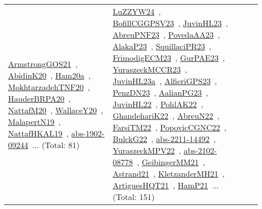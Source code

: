 {\begin{longtable}{lp{3cm}>{\raggedright\arraybackslash}p{6cm}>{\raggedright\arraybackslash}p{6cm}>{\raggedright\arraybackslash}p{8cm}}
\href{../works/ArmstrongGOS21.pdf}{ArmstrongGOS21}~\cite{ArmstrongGOS21}, \href{../works/AbidinK20.pdf}{AbidinK20}~\cite{AbidinK20}, \href{../works/Ham20a.pdf}{Ham20a}~\cite{Ham20a}, \href{../works/MokhtarzadehTNF20.pdf}{MokhtarzadehTNF20}~\cite{MokhtarzadehTNF20}, \href{../works/HauderBRPA20.pdf}{HauderBRPA20}~\cite{HauderBRPA20}, \href{../works/NattafM20.pdf}{NattafM20}~\cite{NattafM20}, \href{../works/WallaceY20.pdf}{WallaceY20}~\cite{WallaceY20}, \href{../works/MalapertN19.pdf}{MalapertN19}~\cite{MalapertN19}, \href{../works/NattafHKAL19.pdf}{NattafHKAL19}~\cite{NattafHKAL19}, \href{../works/abs-1902-09244.pdf}{abs-1902-09244}~\cite{abs-1902-09244}... (Total: 81) & \href{../works/LuZZYW24.pdf}{LuZZYW24}~\cite{LuZZYW24}, \href{../works/BofillCGGPSV23.pdf}{BofillCGGPSV23}~\cite{BofillCGGPSV23}, \href{../works/JuvinHL23.pdf}{JuvinHL23}~\cite{JuvinHL23}, \href{../works/AbreuPNF23.pdf}{AbreuPNF23}~\cite{AbreuPNF23}, \href{../works/PovedaAA23.pdf}{PovedaAA23}~\cite{PovedaAA23}, \href{../works/AlakaP23.pdf}{AlakaP23}~\cite{AlakaP23}, \href{../works/SquillaciPR23.pdf}{SquillaciPR23}~\cite{SquillaciPR23}, \href{../works/FrimodigECM23.pdf}{FrimodigECM23}~\cite{FrimodigECM23}, \href{../works/GurPAE23.pdf}{GurPAE23}~\cite{GurPAE23}, \href{../works/YuraszeckMCCR23.pdf}{YuraszeckMCCR23}~\cite{YuraszeckMCCR23}, \href{../works/JuvinHL23a.pdf}{JuvinHL23a}~\cite{JuvinHL23a}, \href{../works/AlfieriGPS23.pdf}{AlfieriGPS23}~\cite{AlfieriGPS23}, \href{../works/PenzDN23.pdf}{PenzDN23}~\cite{PenzDN23}, \href{../works/AalianPG23.pdf}{AalianPG23}~\cite{AalianPG23}, \href{../works/JuvinHL22.pdf}{JuvinHL22}~\cite{JuvinHL22}, \href{../works/PohlAK22.pdf}{PohlAK22}~\cite{PohlAK22}, \href{../works/GhandehariK22.pdf}{GhandehariK22}~\cite{GhandehariK22}, \href{../works/AbreuN22.pdf}{AbreuN22}~\cite{AbreuN22}, \href{../works/FarsiTM22.pdf}{FarsiTM22}~\cite{FarsiTM22}, \href{../works/PopovicCGNC22.pdf}{PopovicCGNC22}~\cite{PopovicCGNC22}, \href{../works/BulckG22.pdf}{BulckG22}~\cite{BulckG22}, \href{../works/abs-2211-14492.pdf}{abs-2211-14492}~\cite{abs-2211-14492}, \href{../works/YuraszeckMPV22.pdf}{YuraszeckMPV22}~\cite{YuraszeckMPV22}, \href{../works/abs-2102-08778.pdf}{abs-2102-08778}~\cite{abs-2102-08778}, \href{../works/GeibingerMM21.pdf}{GeibingerMM21}~\cite{GeibingerMM21}, \href{../works/Astrand21.pdf}{Astrand21}~\cite{Astrand21}, \href{../works/KletzanderMH21.pdf}{KletzanderMH21}~\cite{KletzanderMH21}, \href{../works/ArtiguesHQT21.pdf}{ArtiguesHQT21}~\cite{ArtiguesHQT21}, \href{../works/HamP21.pdf}{HamP21}~\cite{HamP21}... (Total: 151)\\

\end{longtable}}
